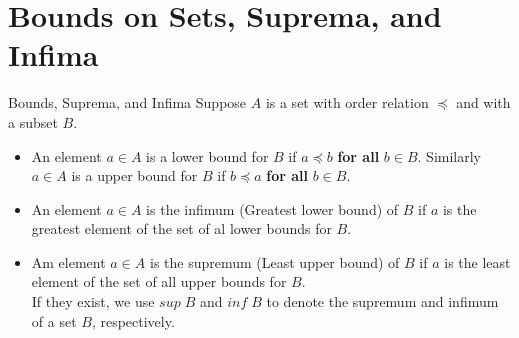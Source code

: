 \documentclass[16pt,a4paper]{article}
\theoremstyle{definition}
\newcommand{\ord}{\preceq}
\begin{document}
\newpage
\section{Bounds on Sets, Suprema, and Infima}
\begin{defn}{Bounds, Suprema, and Infima}{}
Suppose $A$ is a set with order relation $\ord$ and with a subset $B$. 
\begin{itemize}
\item An element $a\in A$ is a lower bound for $B$ if $a\ord b$ \textbf{for all} $b\in B$. Similarly $a\in A$ is a upper bound for $B$ if $b \ord a$ \textbf{for all} $b\in B$. 

\item An element $a\in A$ is the infimum (Greatest lower bound) of $B$ if $a$ is the greatest element of the set of al lower bounds for $B$. 

\item Am element $a\in A$ is the supremum (Least upper bound) of $B$ if $a$ is the least element of the set of all upper bounds for $B$. 
\\
If they exist, we use $sup\;B$ and $inf \;B$ to denote the supremum and infimum of a set $B$, respectively.
 
\end{itemize}
\end{defn}
\end{document}
